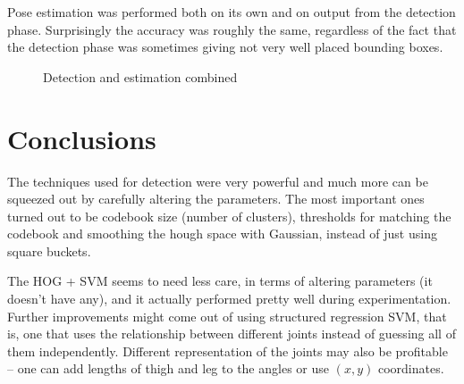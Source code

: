 \documentclass[a4paper]{article}
\begin{document}
Pose estimation was performed both on its own and on output from the detection
phase. Surprisingly the accuracy was roughly the same, regardless of the fact
that the detection phase was sometimes giving not very well placed bounding
boxes.

\begin{figure}[h!]
  \centering
  \caption{Detection and estimation combined}
  \label{fig:detection_estimation}
\end{figure}

\section{Conclusions}
The techniques used for detection were very powerful and much more can be
squeezed out by carefully altering the parameters. The most important ones
turned out to be codebook size (number of clusters), thresholds for matching
the codebook and smoothing the hough space with Gaussian, instead of just using
square buckets.

The HOG + SVM seems to need less care, in terms of altering parameters (it
doesn't have any), and it actually performed pretty well during
experimentation. Further improvements might come out of using structured
regression SVM, that is, one that uses the relationship between different
joints instead of guessing all of them independently. Different representation
of the joints may also be profitable -- one can add lengths of thigh and leg to
the angles or use $ (x, y) $ coordinates.
\end{document}
